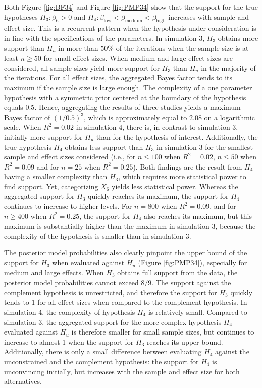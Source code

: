 \documentclass[review, 3p, authoryear]{elsarticle} %
\begin{document}
Both Figure \ref{fig:BF34} and Figure \ref{fig:PMP34} show that the support for the true hypotheses \(H_3:\beta_6>0\) and \(H_4: \beta_{\text{low}} < \beta_{\text{medium}} < \beta_{\text{high}}\) increases with sample and effect size.
This is a recurrent pattern when the hypothesis under consideration is in line with the specifications of the parameters.
In simulation 3, \(H_3\) obtains more support than \(H_u\) in more than \(50\%\) of the iterations when the sample size is at least \(n \geq 50\) for small effect sizes.
When medium and large effect sizes are considered, all sample sizes yield more support for \(H_3\) than \(H_u\) in the majority of the iterations.
For all effect sizes, the aggregated Bayes factor tends to its maximum if the sample size is large enough.
The complexity of a one parameter hypothesis with a symmetric prior centered at the boundary of the hypothesis equals \(0.5\).
Hence, aggregating the results of three studies yields a maximum Bayes factor of \((1/0.5)^3\), which is approximately equal to \(2.08\) on a logarithmic scale.
When \(R^2 = 0.02\) in simulation 4, there is, in contrast to simulation 3, initially more support for \(H_u\) than for the hypothesis of interest.
Additionally, the true hypothesis \(H_4\) obtains less support than \(H_3\) in simulation 3 for the smallest sample and effect sizes considered (i.e., for \(n \leq 100\) when \(R^2 = 0.02\), \(n \leq 50\) when \(R^2 = 0.09\) and for \(n = 25\) when \(R^2 = 0.25\)).
Both findings are the result from \(H_4\) having a smaller complexity than \(H_3\), which requires more statistical power to find support.
Yet, categorizing \(X_6\) yields less statistical power.
Whereas the aggregated support for \(H_3\) quickly reaches its maximum, the support for \(H_4\) continues to increase to higher levels.
For \(n = 800\) when \(R^2 = 0.09\), and for \(n \geq 400\) when \(R^2 = 0.25\), the support for \(H_4\) also reaches its maximum, but this maximum is substantially higher than the maximum in simulation 3, because the complexity of the hypothesis is smaller than in simulation 3.

The posterior model probabilities also clearly pinpoint the upper bound of the support for \(H_3\) when evaluated against \(H_u\) (Figure \ref{fig:PMP34}), especially for medium and large effects.
When \(H_3\) obtains full support from the data, the posterior model probabilities cannot exceed \(8/9\).
The support against the complement hypothesis is unrestricted, and therefore the support for \(H_3\) quickly tends to \(1\) for all effect sizes when compared to the complement hypothesis.
In simulation 4, the complexity of hypothesis \(H_4\) is relatively small.
Compared to simulation 3, the aggregated support for the more complex hypothesis \(H_4\) evaluated against \(H_u\) is therefore smaller for small sample sizes, but continues to increase to almost 1 when the support for \(H_3\) reaches its upper bound.
Additionally, there is only a small difference between evaluating \(H_4\) against the unconstrained and the complement hypothesis: the support for \(H_4\) is unconvincing initially, but increases with the sample and effect size for both alternatives.
\end{document}
